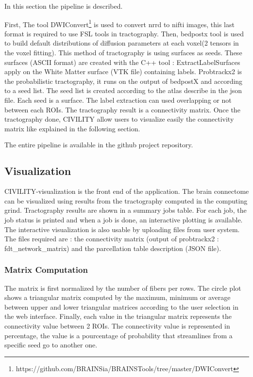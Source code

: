 \documentclass[]{spie}  %
\begin{document}
In this section the pipeline is described. 

First, The tool DWIConvert\footnote{https://github.com/BRAINSia/BRAINSTools/tree/master/DWIConvert} is used to convert nrrd to nifti images, this last format is required to use FSL tools in tractography.
Then, bedpostx tool is used to build default distributions of diffusion parameters at each voxel(2 tensors in the voxel fitting).
This method of tractography is using surfaces as seeds. These surfaces  (ASCII format) are created with the C++ tool : ExtractLabelSurfaces apply on the White Matter surface (VTK file) containing labels.
Probtrackx2 is the probabilistic tractography, it runs on the output of bedpostX and according to a seed list. The seed list is created according to the atlas describe in the json file. Each seed is a surface.  The label extraction can used overlapping or not between each ROIs. The tractography result is a connectivity matrix.
Once the tractography done, CIVILITY allow users to visualize easily the connectivity matrix like explained in the following section. 

The entire pipeline is available in the github project repository.

\subsection{Visualization}

CIVILITY-visualization is the front end of the application. The brain connectome can be visualized using results from the tractography computed in the computing grind. 
Tractography results are shown in a summary jobs table. For each job, the job status is printed and when a job is done, an interactive plotting is available. The interactive visualization is also usable by uploading files from user system. The files required are : the connectivity matrix (output of probtrackx2 : fdt\_network\_matrix) and the parcellation table description (JSON file).

\subsubsection{Matrix Computation}

The matrix is first normalized by the number of fibers per rows. The circle plot shows a triangular matrix computed by the maximum, minimum or average between upper and lower triangular matrices according to the user selection in the web interface. 
Finally, each value in the triangular matrix represents the connectivity value between 2 ROIs. The connectivity value is represented in percentage, the value is a pourcentage of probability that streamlines from a specific seed go to another one.
\end{document}
